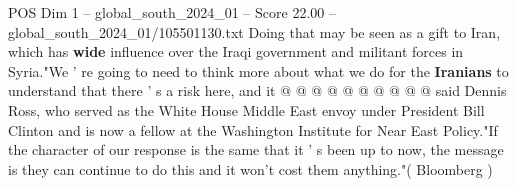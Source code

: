 \begin{textsample}{POS Dim 1 – global\_south\_2024\_01 – Score 22.00 – global\_south\_2024\_01/105501130.txt}
Doing that may be seen as a gift to Iran, which has \textbf{wide} influence over the Iraqi government and militant forces in Syria."We ' re going to need to think more about what we do for the \textbf{Iranians} to understand that there ' s a risk here, and it @ @ @ @ @ @ @ @ @ @ said Dennis Ross, who served as the White House Middle East envoy under President Bill Clinton and is now a fellow at the Washington Institute for Near East Policy."If the character of our response is the same that it ' s been up to now, the message is they can continue to do this and it won't cost them anything."( Bloomberg )

\end{textsample}
